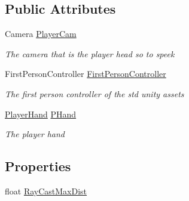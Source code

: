 \subsection*{Public Attributes}
\begin{DoxyCompactItemize}
\item 
Camera \mbox{\hyperlink{class_player_af09423c3841ebcb3c1e77cf3fa1b0084}{Player\+Cam}}
\begin{DoxyCompactList}\small\item\em The camera that is the player head so to speek \end{DoxyCompactList}\item 
First\+Person\+Controller \mbox{\hyperlink{class_player_a2b1dcb2e1f53c780a7501dbc6f89a174}{First\+Person\+Controller}}
\begin{DoxyCompactList}\small\item\em The first person controller of the std unity assets \end{DoxyCompactList}\item 
\mbox{\hyperlink{class_player_hand}{Player\+Hand}} \mbox{\hyperlink{class_player_add63756ae44fffede30732d219ed0410}{P\+Hand}}
\begin{DoxyCompactList}\small\item\em The player hand \end{DoxyCompactList}\end{DoxyCompactItemize}
\subsection*{Properties}
\begin{DoxyCompactItemize}
\item 
float \mbox{\hyperlink{class_player_adafd180f492907d445a3ace023f63040}{Ray\+Cast\+Max\+Dist}}
\end{DoxyCompactItemize}
